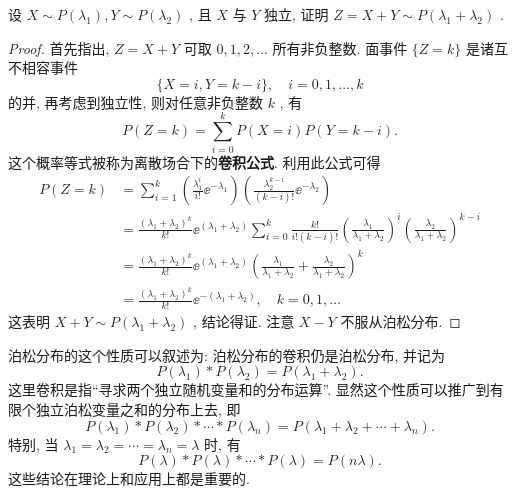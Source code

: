    \begin{example}[(泊松分布的可加性)]\label{exam:3.3.2}
   	设 $X\sim P(\lambda_{1}),Y\sim P(\lambda_2)$ , 且 $X$ 与 $Y$ 独立, 证明 $Z=X+Y\sim P(\lambda_{1}+\lambda_{2})$ .
   	\begin{proof}
   		首先指出, $Z=X+Y$ 可取 $0,1,2,\ldots$ 所有非负整数. 面事件 $\{Z=k\}$ 是诸互不相容事件
   		\begin{equation*}
   			\{X=i,Y=k-i\},\quad i=0,1,\ldots,k
   		\end{equation*}
   		的并, 再考虑到独立性, 则对任意非负整数 $k$ , 有
   		\begin{equation}
   			P(Z=k)=\sum_{i=0}^{k}P(X=i)P(Y=k-i).\label{eq:3.3.1}
   		\end{equation}
   		这个概率等式被称为离散场合下的{\bfseries 卷积公式}. 利用此公式可得
   		\begin{align*}
   			P(Z=k) &=\sum_{i=1}^{k}\left(\frac{\lambda_{1}^i}{i!}\ee^{-\lambda_{1}}\right)\left(\frac{\lambda_2^{k-i}}{(k-i)!}\ee^{-\lambda_{2}}\right)\\
   			&=\frac{(\lambda_{1}+\lambda_{2})^k}{k!}\ee^{(\lambda_{1}+\lambda_{2})}\sum_{i=0}^{k}\frac{k!}{i!(k-i)!}\left(\frac{\lambda_{1}}{\lambda_{1}+\lambda_{2}}\right)^i\left(\frac{\lambda_{2}}{\lambda_{1}+\lambda_{2}}\right)^{k-i}\\
   			&=\frac{(\lambda_{1}+\lambda_{2})^k}{k!}\ee^{(\lambda_{1}+\lambda_{2})}\left(\frac{\lambda_{1}}{\lambda_{1}+\lambda_{2}}+\frac{\lambda_{2}}{\lambda_{1}+\lambda_{2}}\right)^k\\
   			&=\frac{(\lambda_{1}+\lambda_{2})^k}{k!}\ee^{-(\lambda_{1}+\lambda_{2})},\quad k=0,1,\ldots
   		\end{align*}
   		这表明 $X+Y\sim P(\lambda_{1}+\lambda_{2})$ , 结论得证. 注意 $X-Y$ 不服从泊松分布.
   	\end{proof}
   \end{example}
   泊松分布的这个性质可以叙述为: 泊松分布的卷积仍是泊松分布, 并记为
   \begin{equation}
   	P(\lambda_{1})\ast P(\lambda_{2})=P(\lambda_{1}+\lambda_{2}).\label{eq:3.3.2}
   \end{equation}
   这里卷积是指“寻求两个独立随机变量和的分布运算”. 显然这个性质可以推广到有限个独立泊松变量之和的分布上去, 即
   \begin{equation}
   	P(\lambda_{1})\ast P(\lambda_{2})\ast \cdots\ast P(\lambda_n)=P(\lambda_{1}+\lambda_{2}+\cdots+\lambda_n).\label{eq:3.3.3}
   \end{equation}
   特别, 当 $\lambda_{1}=\lambda_{2}=\cdots=\lambda_n=\lambda$ 时, 有
   \begin{equation}
   	P(\lambda)\ast P(\lambda)\ast\cdots\ast P(\lambda)=P(n\lambda).\label{eq:3.3.4}
   \end{equation}
   这些结论在理论上和应用上都是重要的.


